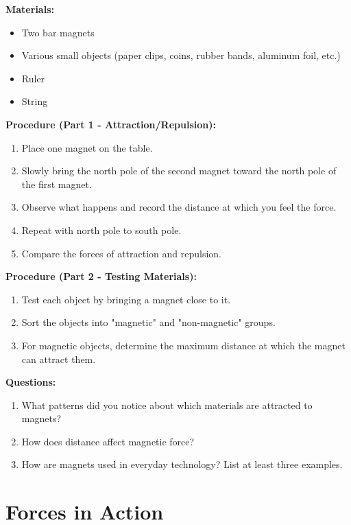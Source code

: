 \documentclass[justified,notoc]{tufte-book}
\newenvironment{investigation}[1]{%
    \begin{tcolorbox}[colback=info!10,colframe=info,title=\textbf{Investigation: #1}]
}{%
    \end{tcolorbox}
}
\begin{document}
\begin{investigation}{Exploring Magnetic Force}
\textbf{Materials:}
\begin{itemize}
    \item Two bar magnets
    \item Various small objects (paper clips, coins, rubber bands, aluminum foil, etc.)
    \item Ruler
    \item String
\end{itemize}

\textbf{Procedure (Part 1 - Attraction/Repulsion):}
\begin{enumerate}
    \item Place one magnet on the table.
    \item Slowly bring the north pole of the second magnet toward the north pole of the first magnet.
    \item Observe what happens and record the distance at which you feel the force.
    \item Repeat with north pole to south pole.
    \item Compare the forces of attraction and repulsion.
\end{enumerate}

\textbf{Procedure (Part 2 - Testing Materials):}
\begin{enumerate}
    \item Test each object by bringing a magnet close to it.
    \item Sort the objects into "magnetic" and "non-magnetic" groups.
    \item For magnetic objects, determine the maximum distance at which the magnet can attract them.
\end{enumerate}

\textbf{Questions:}
\begin{enumerate}
    \item What patterns did you notice about which materials are attracted to magnets?
    \item How does distance affect magnetic force?
    \item How are magnets used in everyday technology? List at least three examples.
\end{enumerate}
\end{investigation}

\section{Forces in Action}
\end{document}
